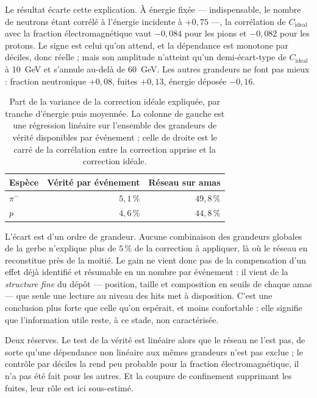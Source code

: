 Le résultat écarte cette explication. À énergie fixée --- indispensable, le nombre de neutrons étant corrélé à l'énergie incidente à $+0{,}75$ ---, la corrélation de $C_{\mathrm{ideal}}$ avec la fraction électromagnétique vaut $-0{,}084$ pour les pions et $-0{,}082$ pour les protons. Le signe est celui qu'on attend, et la dépendance est monotone par déciles, donc réelle ; mais son amplitude n'atteint qu'un demi-écart-type de $C_{\mathrm{ideal}}$ à 10~GeV et s'annule au-delà de 60~GeV. Les autres grandeurs ne font pas mieux : fraction neutronique $+0{,}08$, fuites $+0{,}13$, énergie déposée $-0{,}16$.

\begin{table}[!ht]
\centering
\caption{Part de la variance de la correction idéale expliquée, par tranche d'énergie puis moyennée. La colonne de gauche est une régression linéaire sur l'ensemble des grandeurs de vérité disponibles par événement ; celle de droite est le carré de la corrélation entre la correction apprise et la correction idéale.}
\label{tab:mecanisme}
\small
\begin{tabular}{lrr}
\toprule
Espèce & Vérité par événement & Réseau sur amas \\
\midrule
$\pi^-$ & $5{,}1\,\%$ & $49{,}8\,\%$ \\
$p$     & $4{,}6\,\%$ & $44{,}8\,\%$ \\
\bottomrule
\end{tabular}
\end{table}

L'écart est d'un ordre de grandeur. Aucune combinaison des grandeurs globales de la gerbe n'explique plus de $5\,\%$ de la correction à appliquer, là où le réseau en reconstitue près de la moitié. Le gain ne vient donc pas de la compensation d'un effet déjà identifié et résumable en un nombre par événement : il vient de la \emph{structure fine} du dépôt --- position, taille et composition en seuils de chaque amas --- que seule une lecture au niveau des hits met à disposition. C'est une conclusion plus forte que celle qu'on espérait, et moins confortable : elle signifie que l'information utile reste, à ce stade, non caractérisée.

Deux réserves. Le test de la vérité est linéaire alors que le réseau ne l'est pas, de sorte qu'une dépendance non linéaire aux mêmes grandeurs n'est pas exclue ; le contrôle par déciles la rend peu probable pour la fraction électromagnétique, il n'a pas été fait pour les autres. Et la coupure de confinement supprimant les fuites, leur rôle est ici sous-estimé.

